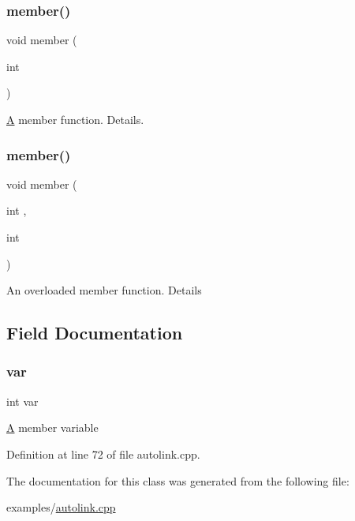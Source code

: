 \subsubsection{\texorpdfstring{member()}{member()}\hspace{0.1cm}{\footnotesize\ttfamily [1/2]}}
{\footnotesize\ttfamily void member (\begin{DoxyParamCaption}\item[{int}]{ }\end{DoxyParamCaption})}

\hyperlink{class_a}{A} member function. Details. \mbox{\label{class_autolink___test_afbb46725b4cc672dbf7b52051ec6df8d}} 
\subsubsection{\texorpdfstring{member()}{member()}\hspace{0.1cm}{\footnotesize\ttfamily [2/2]}}
{\footnotesize\ttfamily void member (\begin{DoxyParamCaption}\item[{int}]{,  }\item[{int}]{ }\end{DoxyParamCaption})}

An overloaded member function. Details 

\subsection{Field Documentation}
\mbox{\label{class_autolink___test_a96c77f9f3a7baec84b9b8add26a31787}} 
\subsubsection{\texorpdfstring{var}{var}}
{\footnotesize\ttfamily int var\hspace{0.3cm}{\ttfamily [protected]}}

\hyperlink{class_a}{A} member variable 

Definition at line 72 of file autolink.\+cpp.



The documentation for this class was generated from the following file\+:\begin{DoxyCompactItemize}
\item 
examples/\hyperlink{autolink_8cpp}{autolink.\+cpp}\end{DoxyCompactItemize}
